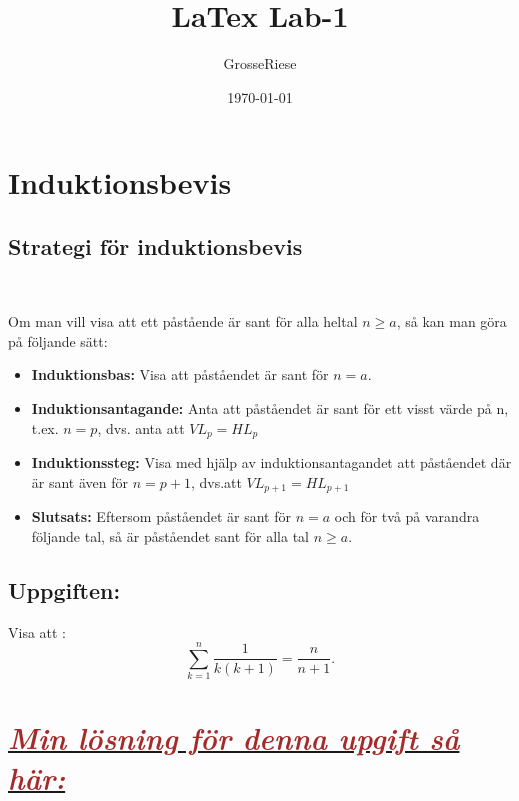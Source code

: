 \documentclass{article}
\title{LaTex Lab-1}
\author{GrosseRiese}
\date{\today}
\begin{document}
\maketitle

\section{Induktionsbevis}
\subsection{Strategi för induktionsbevis} \

\begin{flushleft}

 Om man vill visa att ett påstående är sant för alla heltal \(n\geq a\), så kan man göra på följande sätt:

 \begin{itemize}
  \item \textcolor{Sepia}{\textbf{Induktionsbas: }} Visa att påståendet är sant för  \(n =a\).
  
  \item \textcolor{Sepia}{\textbf{Induktionsantagande: }} Anta att påståendet är sant för ett visst värde på n, t.ex. \(n = p\), dvs. anta att \(VL_{p} = HL_{p}\)
  
  \item \textcolor{Sepia}{\textbf{Induktionssteg: }} Visa med hjälp av induktionsantagandet att påståendet där är sant även för \(n = p+1\), dvs.att \(VL_{p+1} = HL_{p+1}\)

  \item \textcolor{Sepia}{\textbf{Slutsats: }} Eftersom påståendet är sant för \(n = a\) och för två på varandra följande tal, så är påståendet sant för alla tal \(n\geq a\).
  
\end{itemize}

\end{flushleft}


\subsection{Uppgiften: } 

\begin{flushleft}
 Visa att : \[
  \sum_{k=1}^n \frac{1}{k(k+1)} = \frac{n}{n+1}.
  \]
\end{flushleft} 

 \section*{\underline{\textcolor{Brown}{\textit{ Min lösning för denna upgift så här:}} }}
\end{document}
